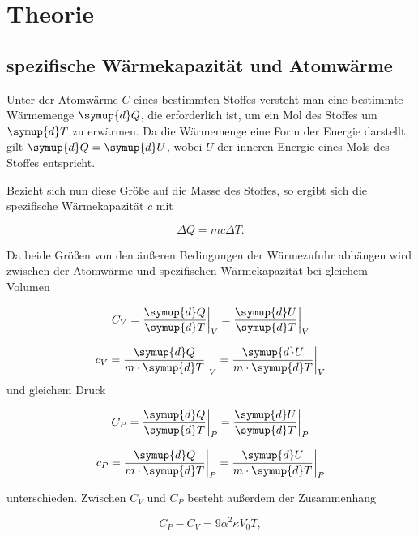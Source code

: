 \section{Theorie}
\label{sec:Theorie}

\subsection{spezifische Wärmekapazität und Atomwärme}
Unter der Atomwärme $C$ eines bestimmten Stoffes 
versteht man eine bestimmte
Wärmemenge $\symup{d}Q$, die erforderlich ist, um
ein Mol des Stoffes um $\symup{d}T$ zu erwärmen.
Da die Wärmemenge eine Form der Energie darstellt,
gilt $\symup{d}Q = \symup{d}U$, wobei $U$ der
inneren Energie eines Mols des Stoffes entspricht.


\noindent Bezieht sich nun diese Größe auf die Masse des Stoffes,
so ergibt sich die spezifische Wärmekapazität $c$ mit

\begin{equation}
    \Delta Q=mc\Delta T.
\end{equation}


\noindent Da beide Größen von den äußeren Bedingungen der
Wärmezufuhr abhängen wird zwischen der Atomwärme
und spezifischen Wärmekapazität bei gleichem Volumen

\begin{equation}
    C_V=\frac{\symup{d}Q}{\symup{d}T}\biggr|_V=\frac{\symup{d}U}{\symup{d}T}\biggr|_V
    \label{eq:b}
\end{equation}

\begin{equation}
    c_V=\frac{\symup{d}Q}{m \cdot \symup{d}T}\biggr|_V=\frac{\symup{d}U}{m \cdot \symup{d}T}\biggr|_V
\end{equation}
\noindent und gleichem Druck

\begin{equation}
    C_P=\frac{\symup{d}Q}{\symup{d}T}\biggr|_P=\frac{\symup{d}U}{\symup{d}T}\biggr|_P
\end{equation}

\begin{equation}
    c_P=\frac{\symup{d}Q}{m \cdot \symup{d}T}\biggr|_P=\frac{\symup{d}U}{m \cdot \symup{d}T}\biggr|_P
\end{equation}

\noindent unterschieden. Zwischen $C_V$ und $C_P$
besteht außerdem der Zusammenhang

\begin{equation}
    C_P-C_V=9\alpha^2\kappa V_0T,
\end{equation}


